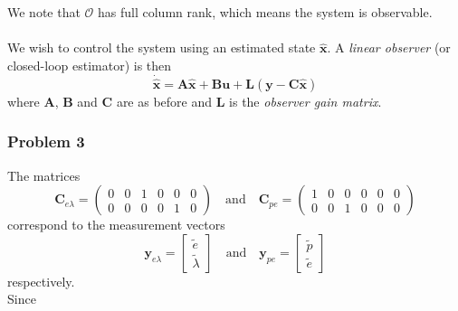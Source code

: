 We note that $\mathbf{\mathcal{O}}$ has full column rank, which means the system is observable.\\
\\
We wish to control the system using an estimated state $\mathbf{\hat{x}}$. A \textit{linear observer} (or closed-loop estimator) is then
\begin{equation}
    \mathbf{\dot{\hat{x}}} = \mathbf{A\hat{x}} + \mathbf{Bu} + \mathbf{L} (\mathbf{y} - \mathbf{C\hat{x}})
\end{equation}
where $\mathbf A$, $\mathbf B$ and $\mathbf C$ are as before and $\mathbf L$ is the \textit{observer gain matrix}.

\subsubsection{Problem 3}
The matrices 
\begin{equation}
    \mathbf{C}_{e\lambda} = \begin{pmatrix}
    0 & 0 & 1 & 0 & 0 & 0 \\
    0 & 0 & 0 & 0 & 1 & 0
    \end{pmatrix}
    \quad \text{and} \quad
    \mathbf{C}_{pe} = \begin{pmatrix}
    1 & 0 & 0 & 0 & 0 & 0 \\
    0 & 0 & 1 & 0 & 0 & 0
    \end{pmatrix}
\end{equation}
correspond to the measurement vectors
\begin{equation}
    \mathbf{y}_{e\lambda} = \begin{bmatrix}
        \tilde e \\
        \tilde \lambda
    \end{bmatrix}
    \quad \text{and} \quad
    \mathbf{y}_{pe} = \begin{bmatrix}
        \tilde p \\
        \tilde e 
    \end{bmatrix}
\end{equation}
respectively.\\
Since
